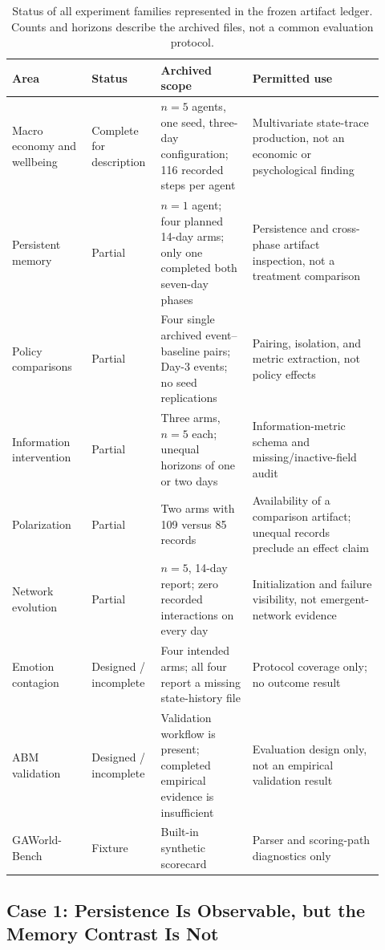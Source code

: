 \begin{table}[t]
\centering
\small
\caption{Status of all experiment families represented in the frozen artifact
ledger.  Counts and horizons describe the archived files, not a common
evaluation protocol.}
\label{tab:archive-status}
\begin{tabular}{@{}p{0.20\linewidth}p{0.16\linewidth}p{0.23\linewidth}p{0.33\linewidth}@{}}
\toprule
Area & Status & Archived scope & Permitted use \\
\midrule
Macro economy and wellbeing & Complete for description & $n=5$ agents, one seed, three-day configuration; 116 recorded steps per agent & Multivariate state-trace production, not an economic or psychological finding \\
Persistent memory & Partial & $n=1$ agent; four planned 14-day arms; only one completed both seven-day phases & Persistence and cross-phase artifact inspection, not a treatment comparison \\
Policy comparisons & Partial & Four single archived event--baseline pairs; Day-3 events; no seed replications & Pairing, isolation, and metric extraction, not policy effects \\
Information intervention & Partial & Three arms, $n=5$ each; unequal horizons of one or two days & Information-metric schema and missing/inactive-field audit \\
Polarization & Partial & Two arms with 109 versus 85 records & Availability of a comparison artifact; unequal records preclude an effect claim \\
Network evolution & Partial & $n=5$, 14-day report; zero recorded interactions on every day & Initialization and failure visibility, not emergent-network evidence \\
Emotion contagion & Designed / incomplete & Four intended arms; all four report a missing state-history file & Protocol coverage only; no outcome result \\
ABM validation & Designed / incomplete & Validation workflow is present; completed empirical evidence is insufficient & Evaluation design only, not an empirical validation result \\
GAWorld-Bench & Fixture & Built-in synthetic scorecard & Parser and scoring-path diagnostics only \\
\bottomrule
\end{tabular}
\end{table}

\subsection{Case 1: Persistence Is Observable, but the Memory Contrast Is Not}

